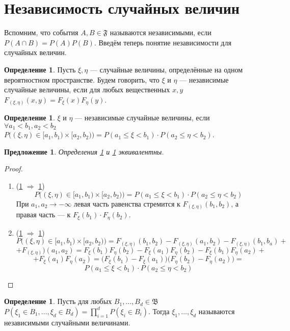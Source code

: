 \documentclass[11pt,openany,a4paper]{scrartcl}
\theoremstyle{plain}
\newtheorem{proposition}[theorem]{Предложение}
\theoremstyle{definition}
\newtheorem{definition}[theorem]{Определение}
\begin{document}
\section{Независимость случайных величин}

Вспомним, что события $A, B \in \mathfrak F$ называются независимыми, если
$P(A \cap B) = P(A)P(B)$. Введём теперь понятие независимости для случайных
величин.

\begin{definition}\label{random_var_independence1}
    Пусть $\xi, \eta$ — случайные величины, определённые на одном вероятностном
    пространстве. Будем говорить, что $\xi$ и $\eta$ — независимые случайные 
    величины, если для любых вещественных $x, y$
    $F_{(\xi, \eta)}(x, y) = F_\xi(x)F_\eta(y)$.
\end{definition}
\begin{definition}\label{random_var_independence2}
    $\xi$ и $\eta$ — независимые случайные величины, если
    $\forall a_1 < b_1, a_2 < b_2$ $P\big((\xi, \eta) \in [a_1, b_1) \times
    [a_2, b_2)\big) = P(a_1 \leqslant \xi < b_1) \cdot P(a_2 \leqslant
    \eta < b_2)$.
\end{definition}

\begin{proposition}
    Определения \ref{random_var_independence1} и \ref{random_var_independence2} 
    эквивалентны.
\end{proposition}
\begin{proof}
\mbox{}
    \begin{enumerate}
        \item (\ref{random_var_independence1} $\Rightarrow$
        \ref{random_var_independence2})
        $$
        P\big((\xi, \eta) \in [a_1, b_1) \times
        [a_2, b_2)\big) = P(a_1 \leqslant \xi < b_1) \cdot P(a_2 \leqslant
        \eta < b_2)
        $$
        При $a_1, a_2 \to -\infty$ левая часть равенства стремится к
        $F_{(\xi, \eta)}(b_1, b_2)$, а правая часть — к
        $F_\xi(b_1)\cdot F_\eta(b_2)$.
        \item (\ref{random_var_independence2} $\Rightarrow$
        \ref{random_var_independence1})
        $$
        P\big((\xi, \eta) \in [a_1, b_1) \times
        [a_2, b_2)\big) = F_{(\xi, \eta)}(b_1, b_2) - F_{(\xi, \eta)}(a_1, b_2)
        - F_{(\xi, \eta)}(b_1, b_a) +
        $$
        $$
        + F_{(\xi, \eta)})(a_1, a_2) = F_\xi(b_1)F_\eta(b_2) - 
        F_\xi(a_1)F_\eta(b_2) - F_\xi(b_1)F_\eta(a_2) +
        $$
        $$
        +F_\xi(a_1)F_\eta(a_2) = \big(F_\xi(b_1) - F_\xi(a_1)\big)
        \big(F_\eta(b_2) - F_\eta(a_2)\big) = 
        $$
        $$
        P(a_1 \leqslant \xi < b_1) \cdot
        P(a_2 \leqslant \eta < b_2)
        $$
    \end{enumerate}
\end{proof}
\begin{definition}\label{random_var_independence3}
    Пусть для любых $B_1,\ldots, B_d \in \mathfrak B$ $P(\xi_1 \in B_1, \ldots,
    \xi_d \in B_d) = \prod\limits_{i=1}^d P(\xi_i \in B_i)$. Тогда $\xi_1, \ldots,
    \xi_d$ называются независимыми случайными величинами.
\end{definition}
\end{document}
